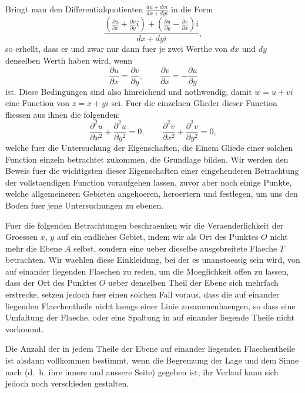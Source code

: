 \documentclass[12pt,a4paper]{book}
\theoremstyle{definition}
\theoremstyle{remark}
\begin{document}
Bringt man den Differentialquotienten $\frac{du + dvi}{dx + dyi}$ in die Form
\[
\frac{\left(\frac{\partial u}{\partial x} + \frac{\partial v}{\partial y}i\right) + \left(\frac{\partial u}{\partial y} - \frac{\partial v}{\partial x}\right)i}{dx + dyi},
\]
so erhellt, dass er und zwar nur dann fuer je zwei Werthe von $dx$ und $dy$ denselben Werth haben wird, wenn
\begin{equation}\label{eq:cauchy-riemann}
\frac{\partial u}{\partial x} = \frac{\partial v}{\partial y}, \qquad \frac{\partial v}{\partial x} = -\frac{\partial u}{\partial y}
\end{equation}
ist. Diese Bedingungen sind also hinreichend und nothwendig, damit $w = u + vi$ eine Function von $z = x + yi$ sei. Fuer die einzelnen Glieder dieser Function fliessen aus ihnen die folgenden:
\begin{equation}
\frac{\partial^2 u}{\partial x^2} + \frac{\partial^2 u}{\partial y^2} = 0, \qquad \frac{\partial^2 v}{\partial x^2} + \frac{\partial^2 v}{\partial y^2} = 0,
\end{equation}
welche fuer die Untersuchung der Eigenschaften, die Einem Gliede einer solchen Function einzeln betrachtet zukommen, die Grundlage bilden. Wir werden den Beweis fuer die wichtigsten dieser Eigenschaften einer eingehenderen Betrachtung der vollstaendigen Function voraufgehen lassen, zuvor aber noch einige Punkte, welche allgemeineren Gebieten angehoeren, heroertern und festlegen, um uns den Boden fuer jene Untersuchungen zu ebenen.

Fuer die folgenden Betrachtungen beschraenken wir die Veraenderlichkeit der Groessen $x$, $y$ auf ein endliches Gebiet, indem wir als Ort des Punktes $O$ nicht mehr die Ebene $A$ selbst, sondern eine ueber dieselbe ausgebreitete Flaeche $T$ betrachten. Wir waehlen diese Einkleidung, bei der es unanstoessig sein wird, von auf einander liegenden Flaechen zu reden, um die Moeglichkeit offen zu lassen, dass der Ort des Punktes $O$ ueber denselben Theil der Ebene sich mehrfach erstrecke, setzen jedoch fuer einen solchen Fall voraus, dass die auf einander liegenden Flaechentheile nicht laengs einer Linie zusammenhaengen, so dass eine Umfaltung der Flaeche, oder eine Spaltung in auf einander liegende Theile nicht vorkommt.

Die Anzahl der in jedem Theile der Ebene auf einander liegenden Flaechentheile ist alsdann vollkommen bestimmt, wenn die Begrenzung der Lage und dem Sinne nach (d.\ h. ihre innere und aussere Seite) gegeben ist; ihr Verlauf kann sich jedoch noch verschieden gestalten.
\end{document}
